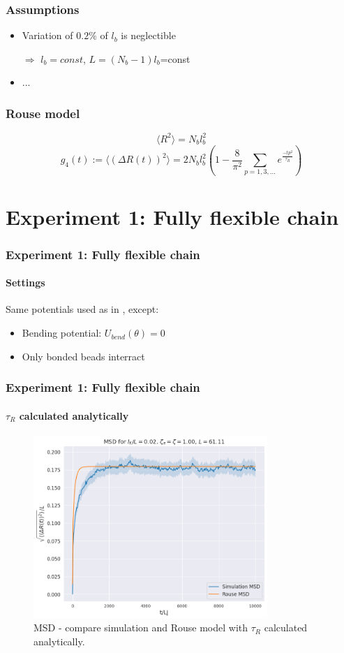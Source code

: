 \documentclass[handout]{beamer}
\newcommand{\mean}[1]{\langle #1 \rangle}
\begin{document}
\begin{frame}
    \frametitle{Assumptions}
    \begin{itemize}
        \item Variation of $0.2\%$ of $l_b$ is neglectible \cite{svaneborg_2020} 
        
        $\Rightarrow$ $l_b=const$, $L=(N_b-1) l_b$=const

        \item ...
    \end{itemize} 
\end{frame}


\begin{frame}
    \frametitle{Rouse model}
    \begin{equation}
        \mean{R^2}=N_b l_b^2
    \end{equation}
    \begin{equation}
        g_4(t) := \mean{(\Delta R(t))^2} = 2 N_b l_b^2 (1-\frac{8}{\pi^2}\sum_{p=1,3,...}e^{\frac{-t p^2}{\tau_R}})
    \end{equation}

\end{frame}

\section{Experiment 1: Fully flexible chain}


\begin{frame}
    \frametitle{Experiment 1: Fully flexible chain}
    \framesubtitle{Settings}
    Same potentials used as in \cite[Section 2.1]{svaneborg_2020}, except:
    \begin{itemize}
        \item Bending potential: $U_{bend}(\theta)=0$
        \item Only bonded beads interract
    \end{itemize}
\end{frame}


\begin{frame}
    \frametitle{Experiment 1: Fully flexible chain}
    \framesubtitle{$\tau_R$ calculated analytically}

    \begin{figure}[h]
        \includegraphics[trim={0.1cm 0.1cm 0.1cm 1cm},clip,height=6.9cm]{./3-exp-fixed-param.png}
        \caption{MSD - compare simulation and Rouse model with $\tau_R$ calculated analytically.}
        \label{fig:full-flex-chain-fixed}
    \end{figure}
\end{frame}
\end{document}
